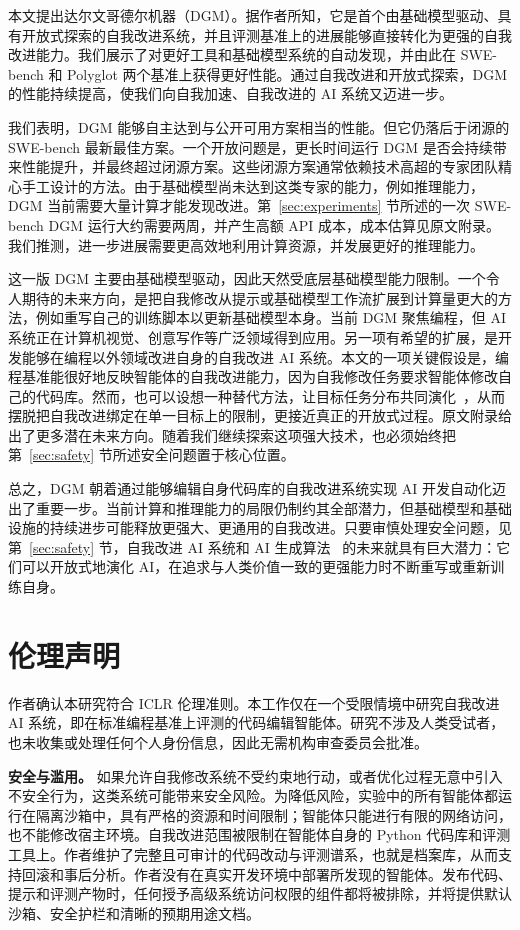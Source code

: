 \documentclass[10pt,twocolumn]{article}
\begin{document}
本文提出达尔文哥德尔机器（DGM）。据作者所知，它是首个由基础模型驱动、具有开放式探索的自我改进系统，并且评测基准上的进展能够直接转化为更强的自我改进能力。我们展示了对更好工具和基础模型系统的自动发现，并由此在 SWE-bench 和 Polyglot 两个基准上获得更好性能。通过自我改进和开放式探索，DGM 的性能持续提高，使我们向自我加速、自我改进的 AI 系统又迈进一步。

我们表明，DGM 能够自主达到与公开可用方案相当的性能。但它仍落后于闭源的 SWE-bench 最新最佳方案。一个开放问题是，更长时间运行 DGM 是否会持续带来性能提升，并最终超过闭源方案。这些闭源方案通常依赖技术高超的专家团队精心手工设计的方法。由于基础模型尚未达到这类专家的能力，例如推理能力，DGM 当前需要大量计算才能发现改进。第~\ref{sec:experiments} 节所述的一次 SWE-bench DGM 运行大约需要两周，并产生高额 API 成本，成本估算见原文附录。我们推测，进一步进展需要更高效地利用计算资源，并发展更好的推理能力。

这一版 DGM 主要由基础模型驱动，因此天然受底层基础模型能力限制。一个令人期待的未来方向，是把自我修改从提示或基础模型工作流扩展到计算量更大的方法，例如重写自己的训练脚本以更新基础模型本身。当前 DGM 聚焦编程，但 AI 系统正在计算机视觉、创意写作等广泛领域得到应用。另一项有希望的扩展，是开发能够在编程以外领域改进自身的自我改进 AI 系统。本文的一项关键假设是，编程基准能很好地反映智能体的自我改进能力，因为自我修改任务要求智能体修改自己的代码库。然而，也可以设想一种替代方法，让目标任务分布共同演化~\citep{faldor2025omni,wang2023robogen}，从而摆脱把自我改进绑定在单一目标上的限制，更接近真正的开放式过程。原文附录给出了更多潜在未来方向。随着我们继续探索这项强大技术，也必须始终把第~\ref{sec:safety} 节所述安全问题置于核心位置。

总之，DGM 朝着通过能够编辑自身代码库的自我改进系统实现 AI 开发自动化迈出了重要一步。当前计算和推理能力的局限仍制约其全部潜力，但基础模型和基础设施的持续进步可能释放更强大、更通用的自我改进。只要审慎处理安全问题，见第~\ref{sec:safety} 节，自我改进 AI 系统和 AI 生成算法~\citep{clune2019ai} 的未来就具有巨大潜力：它们可以开放式地演化 AI，在追求与人类价值一致的更强能力时不断重写或重新训练自身。

\section*{伦理声明}

作者确认本研究符合 ICLR 伦理准则。本工作仅在一个受限情境中研究自我改进 AI 系统，即在标准编程基准上评测的代码编辑智能体。研究不涉及人类受试者，也未收集或处理任何个人身份信息，因此无需机构审查委员会批准。

\textbf{安全与滥用。}
如果允许自我修改系统不受约束地行动，或者优化过程无意中引入不安全行为，这类系统可能带来安全风险。为降低风险，实验中的所有智能体都运行在隔离沙箱中，具有严格的资源和时间限制；智能体只能进行有限的网络访问，也不能修改宿主环境。自我改进范围被限制在智能体自身的 Python 代码库和评测工具上。作者维护了完整且可审计的代码改动与评测谱系，也就是档案库，从而支持回滚和事后分析。作者没有在真实开发环境中部署所发现的智能体。发布代码、提示和评测产物时，任何授予高级系统访问权限的组件都将被排除，并将提供默认沙箱、安全护栏和清晰的预期用途文档。
\end{document}
